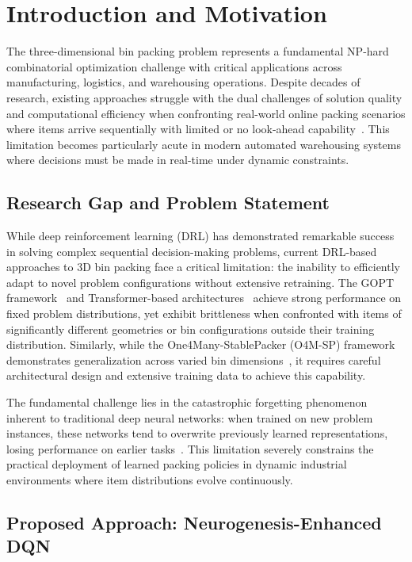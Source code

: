\documentclass[12pt]{article}
\begin{document}
\section{Introduction and Motivation}

The three-dimensional bin packing problem represents a fundamental NP-hard combinatorial optimization challenge with critical applications across manufacturing, logistics, and warehousing operations. Despite decades of research, existing approaches struggle with the dual challenges of solution quality and computational efficiency when confronting real-world online packing scenarios where items arrive sequentially with limited or no look-ahead capability~\cite{drl_concurrent2024}. This limitation becomes particularly acute in modern automated warehousing systems where decisions must be made in real-time under dynamic constraints.

\subsection{Research Gap and Problem Statement}

While deep reinforcement learning (DRL) has demonstrated remarkable success in solving complex sequential decision-making problems, current DRL-based approaches to 3D bin packing face a critical limitation: the inability to efficiently adapt to novel problem configurations without extensive retraining. The GOPT framework~\cite{gopt2024} and Transformer-based architectures~\cite{transformer_packing2023} achieve strong performance on fixed problem distributions, yet exhibit brittleness when confronted with items of significantly different geometries or bin configurations outside their training distribution. Similarly, while the One4Many-StablePacker (O4M-SP) framework demonstrates generalization across varied bin dimensions~\cite{one4many2024}, it requires careful architectural design and extensive training data to achieve this capability.

The fundamental challenge lies in the catastrophic forgetting phenomenon inherent to traditional deep neural networks: when trained on new problem instances, these networks tend to overwrite previously learned representations, losing performance on earlier tasks~\cite{neurogenesis_dl2017}. This limitation severely constrains the practical deployment of learned packing policies in dynamic industrial environments where item distributions evolve continuously.

\subsection{Proposed Approach: Neurogenesis-Enhanced DQN}
\end{document}
